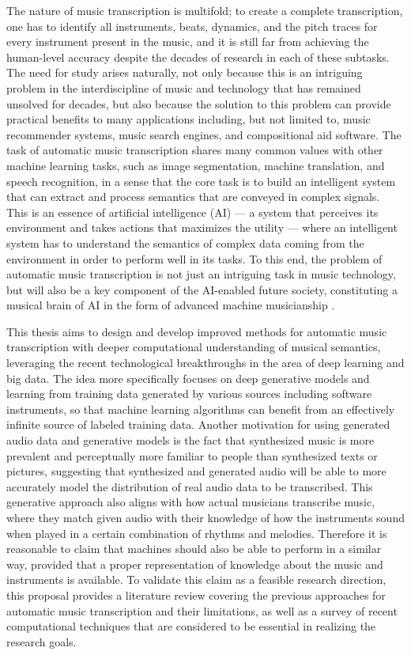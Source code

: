 The nature of music transcription is multifold; to create a complete transcription, one has to identify all instruments, beats, dynamics, and the pitch traces for every instrument present in the music, and it is still far from achieving the human-level accuracy despite the decades of research in each of these subtasks.
The need for study arises naturally, not only because this is an intriguing problem in the interdiscipline of music and technology that has remained unsolved for decades, but also because the solution to this problem can provide practical benefits to many applications including, but not limited to, music recommender systems, music search engines, and compositional aid software.
The task of automatic music transcription shares many common values with other machine learning tasks, such as image segmentation, machine translation, and speech recognition, in a sense that the core task is to build an intelligent system that can extract and process semantics that are conveyed in complex signals.
This is an essence of artificial intelligence (AI)
--- a system that perceives its environment and takes actions that maximizes the utility \cite{russell2009ai} --- 
where an intelligent system has to understand the semantics of complex data coming from the environment in order to perform well in its tasks.
To this end, the problem of automatic music transcription is not just an intriguing task in music technology, but will also be a key component of the AI-enabled future society, constituting a musical brain of AI in the form of advanced machine musicianship \cite{rowe2003musicianship}.


This thesis aims to design and develop improved methods for automatic music transcription with deeper computational understanding of musical semantics, leveraging the recent technological breakthroughs in the area of deep learning and big data.
The idea more specifically focuses on deep generative models and learning from training data generated by various sources including software instruments, so that machine learning algorithms can benefit from an effectively infinite source of labeled training data.
Another motivation for using generated audio data and generative models is the fact that synthesized music is more prevalent and perceptually more familiar to people than synthesized texts or pictures, suggesting that synthesized and generated audio will be able to more accurately model the distribution of real audio data to be transcribed.
This generative approach also aligns with how actual musicians transcribe music, where they match given audio with their knowledge of how the instruments sound when played in a certain combination of rhythms and melodies.
Therefore it is reasonable to claim that machines should also be able to perform in a similar way, provided that a proper representation of knowledge about the music and instruments is available.
To validate this claim as a feasible research direction, this proposal provides a literature review covering the previous approaches for automatic music transcription and their limitations, as well as a survey of recent computational techniques that are considered to be essential in realizing the research goals.



